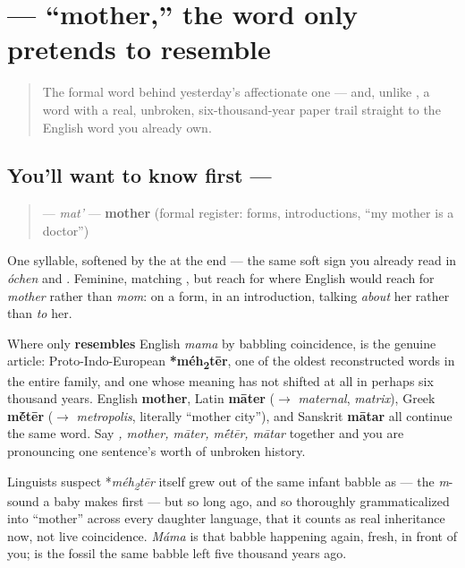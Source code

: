 \section[\texorpdfstring{\ru{мать} (mat')}{мать (mat')}]{ — \textquotedblleft{}mother,\textquotedblright{} the word  only pretends to resemble}

\label{lesson:RU-C12-mat}



\begin{quote}
The formal word behind yesterday's affectionate one — and, unlike \emph{}, a word with a real, unbroken, six-thousand-year paper trail straight to the English word you already own.
\end{quote}

\subsection*{You'll want to know first — }
\begin{quote}
\textbf{} — \emph{mat'} — \textbf{mother} (formal register: forms, introductions, \textquotedblleft{}my mother is a doctor\textquotedblright{})
\end{quote}

One syllable, softened by the \textbf{} at the end — the same soft sign you already read in \emph{óchen} and \emph{}. Feminine, matching \emph{}, but reach for \emph{} where English would reach for \emph{mother} rather than \emph{mom}: on a form, in an introduction, talking \emph{about} her rather than \emph{to} her.

\begin{cousinweb}
Where \emph{} only \textbf{resembles} English \emph{mama} by babbling coincidence, \textbf{} is the genuine article: Proto-Indo-European \textbf{*méh\textsubscript{2}tēr}, one of the oldest reconstructed words in the entire family, and one whose meaning has not shifted at all in perhaps six thousand years. English \textbf{mother}, Latin \textbf{māter} ($\to$ \emph{maternal}, \emph{matrix}), Greek \textbf{m\'{\={e}}tēr} ($\to$ \emph{metropolis}, literally \textquotedblleft{}mother city\textquotedblright{}), and Sanskrit \textbf{mātar} all continue the same word. Say \emph{, mother, māter, m\'{\={e}}tēr, mātar} together and you are pronouncing one sentence's worth of unbroken history.

Linguists suspect *\emph{méh\textsubscript{2}tēr} itself grew out of the same infant babble as \emph{} — the \emph{m}-sound a baby makes first — but so long ago, and so thoroughly grammaticalized into \textquotedblleft{}mother\textquotedblright{} across every daughter language, that it counts as real inheritance now, not live coincidence. \emph{Máma} is that babble happening again, fresh, in front of you; \emph{} is the fossil the same babble left five thousand years ago.
\end{cousinweb}

